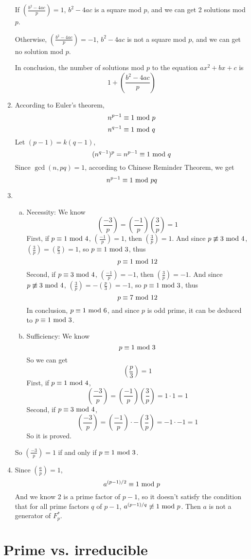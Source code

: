\documentclass{article}
\renewcommand{\mod}{{\rm\ mod\ }}
\begin{document}
\begin{enumerate}
If $\left(\frac{b^2-4ac}{p}\right)=1$, $b^2-4ac$ is a square mod $p$, and we can get 2 solutions mod $p$.

Otherwise, $\left(\frac{b^2-4ac}{p}\right)=-1$, $b^2-4ac$ is not a square mod $p$, and we can get no solution mod $p$.

In conclusion, the number of solutions mod $p$ to the equation $ax^2+bx+c$ is 
$$1+\left(\frac{b^2-4ac}{p}\right)$$
\item
According to Euler's theorem, $$n^{p-1}\equiv1\mod p$$ $$n^{q-1}\equiv1\mod q$$
Let $(p-1)=k(q-1)$,
$$(n^{q-1})^p=n^{p-1}\equiv1\mod q$$
Since $\gcd(n,pq)=1$, according to Chinese Reminder Theorem, we get
$$n^{p-1}\equiv1\mod pq$$

\item
\begin{enumerate}[(a)]
\item Necessity: We know 
$$\left(\frac{-3}{p}\right)=\left(\frac{-1}{p}\right)\left(\frac{3}{p}\right)=1$$
First, if $p\equiv1\mod4$, $\left(\frac{-1}{p}\right)=1$, then $\left(\frac{3}{p}\right)=1$. And since $p\not\equiv3\mod4$, $\left(\frac{3}{p}\right)=\left(\frac{p}{3}\right)=1$, so $p\equiv1\mod3$, thus $$p\equiv1\mod12$$
Second, if $p\equiv3\mod4$, $\left(\frac{-1}{p}\right)=-1$, then $\left(\frac{3}{p}\right)=-1$. And since $p\not\equiv3\mod4$, $\left(\frac{3}{p}\right)=-\left(\frac{p}{3}\right)=-1$, so $p\equiv1\mod3$, thus $$p\equiv7\mod12$$
In conclusion, $p\equiv1\mod6$, and since $p$ is odd prime, it can be deduced to $p\equiv1\mod3$.
\item Sufficiency: We know
$$p\equiv1\mod3$$
So we can get $$\left(\frac{p}{3}\right)=1$$
First, if $p\equiv1\mod4$, $$\left(\frac{-3}{p}\right)=\left(\frac{-1}{p}\right)\left(\frac{3}{p}\right)=1\cdot1=1$$
Second, if $p\equiv3\mod4$, $$\left(\frac{-3}{p}\right)=\left(\frac{-1}{p}\right)\cdot-\left(\frac{3}{p}\right)=-1\cdot-1=1$$
So it is proved.
\end{enumerate}
So $\left(\frac{-3}{p}\right)=1$ if and only if $p\equiv1\mod3$.

\item
Since $\left(\frac{a}{p}\right)=1$,
$$a^{(p-1)/2}\equiv1\mod p$$
And we know 2 is a prime factor of $p-1$, so it doesn't satisfy the condition that for all prime factors $q$ of $p-1$, $a^{(p-1)/q}\not\equiv1\mod p$. Then $a$ is not a generator of $F_p^*$.

\end{enumerate}

\section{Prime vs. irreducible}
\end{document}
